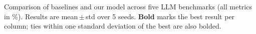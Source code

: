 \caption{Comparison of baselines and our model across five LLM benchmarks (all metrics in \%). Results are mean\,$\pm$\,std over 5 seeds. \textbf{Bold} marks the best result per column; ties within one standard deviation of the best are also bolded.}
